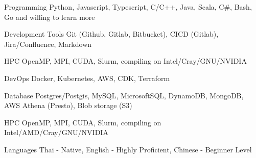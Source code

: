 

\begin{cvskills}

  \cvskill
    {Programming} %
    {Python, Javascript, Typescript, C/C++, Java, Scala, C\#, Bash, Go and willing to learn more} %

\cvskill
    {Development Tools} %
    {Git (Github, Gitlab, Bitbucket), CICD (Gitlab), Jira/Confluence, Markdown} %

  \cvskill
    {HPC} %
    {OpenMP, MPI, CUDA, Slurm, compiling on Intel/Cray/GNU/NVIDIA } %

  \cvskill
    {DevOps} %
    {Docker, Kubernetes, AWS, CDK, Terraform} %

  \cvskill
    {Database}
    {Postgres/Postgis, MySQL, MicrosoftSQL, DynamoDB, MongoDB, AWS Athena (Presto), Blob storage (S3)}

\cvskill
  {HPC} %
  {OpenMP, MPI, CUDA, Slurm, compiling on Intel/AMD/Cray/GNU/NVIDIA } %

  \cvskill
    {Languages} %
    {Thai - Native, English - Highly Proficient, Chinese - Beginner Level} %

\end{cvskills}
